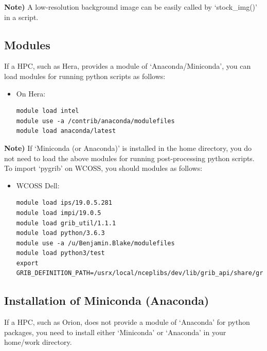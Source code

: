 \documentclass[11pt,fleqn]{report}              %
\begin{document}
{\bf Note)} A low-resolution background image can be easily called by `stock\_img()' in a script.



\subsection{Modules}

If a HPC, such as Hera, provides a module of `Anaconda/Miniconda', you can load modules for running python scripts as follows:
\begin{itemize}
\item On Hera:
\lstset{language=bash}   
\begin{lstlisting}[frame=trBL]
module load intel
module use -a /contrib/anaconda/modulefiles
module load anaconda/latest
\end{lstlisting}
\end{itemize}
{\bf Note)} If `Miniconda (or Anaconda)' is installed in the home directory, you do not need to load the above modules for running post-processing python scripts. \\

To import `pygrib' on WCOSS, you should modules as follows:
\begin{itemize}
\item WCOSS Dell:
\lstset{language=bash}   
\begin{lstlisting}[frame=trBL]
module load ips/19.0.5.281
module load impi/19.0.5
module load grib_util/1.1.1
module load python/3.6.3
module use -a /u/Benjamin.Blake/modulefiles
module load python3/test
export GRIB_DEFINITION_PATH=/usrx/local/nceplibs/dev/lib/grib_api/share/grib_api/definitions
\end{lstlisting}

\end{itemize}


\subsection{Installation of Miniconda (Anaconda)}

If a HPC, such as Orion, does not provide a module of `Anaconda' for python packages, you need to install either `Miniconda' or `Anaconda' in your home/work directory.
\end{document}

